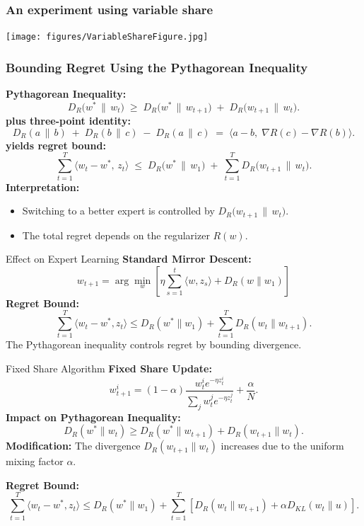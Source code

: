 \documentclass[handout]{beamer}
\begin{document}
\begin{small}
\begin{frame}
\frametitle{An experiment using variable share}
\texttt{[image: figures/VariableShareFigure.jpg]}
\end{frame}


\begin{frame}
  \frametitle{Bounding Regret Using the Pythagorean Inequality}

  \textbf{Pythagorean Inequality:}
  \[
    D_{R}\bigl(w^* \,\|\, w_t\bigr)
    \;\ge\;
    D_{R}\bigl(w^* \,\|\, w_{t+1}\bigr)
    \;+\;
    D_{R}\bigl(w_{t+1} \,\|\, w_t\bigr).
  \]
  \pause
  \textbf{plus three-point identity:}
  \[
    D_{R}(a\,\|\,b) 
    \;+\; 
    D_{R}(b\,\|\,c)
    \;-\; 
    D_{R}(a\,\|\,c)
    \;=\;
    \langle a - b,\;\nabla R(c) - \nabla R(b)\rangle.
  \]
\pause
  \textbf{yields regret bound:}
  \[
    \sum_{t=1}^{T} \langle w_t - w^*,\, z_t\rangle
    \;\le\;
    D_{R}\bigl(w^* \,\|\, w_1\bigr)
    \;+\;
    \sum_{t=1}^{T} D_{R}\bigl(w_{t+1} \,\|\, w_t\bigr).
  \]
  \pause
  \textbf{Interpretation:}
  \begin{itemize}
    \item Switching to a better expert is controlled by 
          \(D_{R}\bigl(w_{t+1}\,\|\,w_t\bigr)\).
    \item The total regret depends on the regularizer \(R(w)\).
  \end{itemize}
\end{frame}

\begin{frame}{Effect on Expert Learning}
\textbf{Standard Mirror Descent:}  
\[
w_{t+1} = \arg\min_{w} \left[ \eta \sum_{s=1}^{t} \langle w, z_s \rangle + D_R(w \| w_1) \right]
\]
\textbf{Regret Bound:}  
\[
\sum_{t=1}^{T} \langle w_t - w^*, z_t \rangle \leq D_R(w^* \| w_1) + \sum_{t=1}^{T} D_R(w_t \| w_{t+1}).
\]
\textcolor{mathcolor}{The Pythagorean inequality controls regret by bounding divergence.}
\end{frame}

\begin{frame}{Fixed Share Algorithm}
\textbf{Fixed Share Update:}  
\[
w_{t+1}^i = (1 - \alpha) \frac{w_t^i e^{-\eta z_t^i}}{\sum_j w_t^j e^{-\eta z_t^j}} + \frac{\alpha}{N}.
\]
\textbf{Impact on Pythagorean Inequality:}
\[
D_R(w^* \| w_t) \geq D_R(w^* \| w_{t+1}) + D_R(w_{t+1} \| w_t).
\]
\textbf{Modification:}  
\textcolor{mathcolor}{The divergence \( D_R(w_{t+1} \| w_t) \) increases due to the uniform mixing factor \( \alpha \).}

\textbf{Regret Bound:}  
\[
\sum_{t=1}^{T} \langle w_t - w^*, z_t \rangle \leq D_R(w^* \| w_1) + \sum_{t=1}^{T} \left[ D_R(w_t \| w_{t+1}) + \alpha D_{KL}(w_t \| u) \right].
\]
\end{frame}


\end{small}
\end{document}
